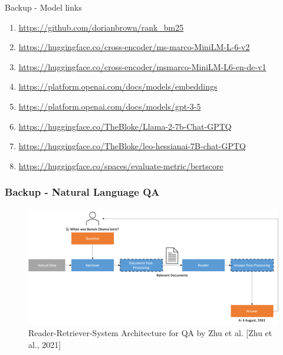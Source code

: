 \documentclass{beamer}
\begin{document}
\begin{frame}{Backup - Model links}
  \tiny{
  \begin{enumerate}
    \item \url{https://github.com/dorianbrown/rank_bm25}
    \item \url{https://huggingface.co/cross-encoder/ms-marco-MiniLM-L-6-v2}
    \item \url{https://huggingface.co/cross-encoder/msmarco-MiniLM-L6-en-de-v1}
    \item \url{https://platform.openai.com/docs/models/embeddings}
    \item \url{https://platform.openai.com/docs/models/gpt-3-5}
    \item \url{https://huggingface.co/TheBloke/Llama-2-7b-Chat-GPTQ}
    \item \url{https://huggingface.co/TheBloke/leo-hessianai-7B-chat-GPTQ}
    \item \url{https://huggingface.co/spaces/evaluate-metric/bertscore}
  \end{enumerate}
  }
\end{frame}

\begin{frame}
  \frametitle{Backup - Natural Language QA}

  \begin{figure}
    \includegraphics[width=\textwidth]{Grafiken/Retriever_Reader.png}
    \caption{Reader-Retriever-System Architecture for QA by Zhu et al. [Zhu et al., 2021]}
  \end{figure}

\end{frame}
\end{document}
